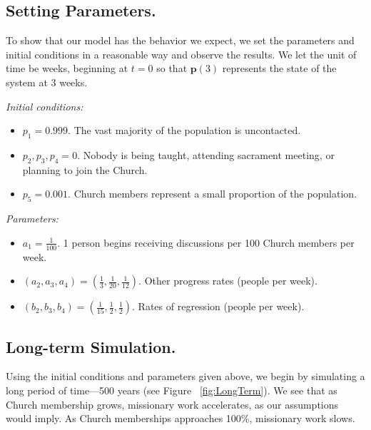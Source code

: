 \documentclass[11pt]{amsart}
\begin{document}
\subsection*{Setting Parameters.}
\begin{center}
\hspace{0pt}
\end{center}

\nopagebreak

To show that our model has the behavior we expect, we set the parameters and initial conditions in a reasonable way and observe the results. We let the unit of time be weeks, beginning at $t=0$ so that $\boldsymbol{p}(3)$ represents the state of the system at 3 weeks.

\textit{Initial conditions:}
\begin{itemize}
    \item $p_1 = 0.999$. The vast majority of the population is uncontacted.
    \item $p_2, p_3, p_4 = 0$. Nobody is being taught, attending sacrament meeting, or planning to join the Church.
    \item $p_5 = 0.001$. Church members represent a small proportion of the population.
\end{itemize}

\textit{Parameters:}
\begin{itemize}
    \item $a_1 = \frac{1}{100}$. 1 person begins receiving discussions per 100 Church members per week.
    \item $(a_2, a_3, a_4) = (\frac{1}{3}, \frac{1}{20}, \frac{1}{12})$. Other progress rates (people per week).
    \item $(b_2, b_3, b_4) = (\frac{1}{15}, \frac{1}{2}, \frac{1}{2})$. Rates of regression (people per week).
\end{itemize}

\subsection*{Long-term Simulation.}
\begin{center}
\hspace{0pt}
\end{center}

\nopagebreak

Using the initial conditions and parameters given above, we begin by simulating a long period of time---500 years (see Figure ~\ref{fig:LongTerm}). We see that as Church membership grows, missionary work accelerates, as our assumptions would imply. As Church memberships approaches 100\%, missionary work slows.
\end{document}
